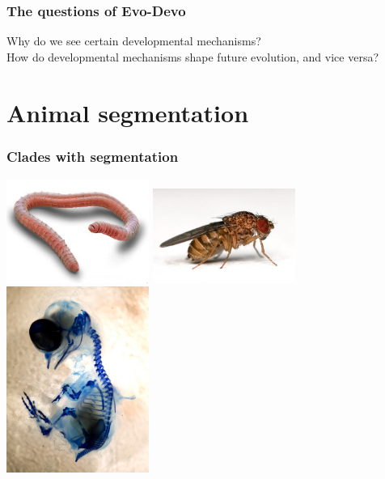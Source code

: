 \documentclass[compress]{beamer}
\begin{document}
\begin{frame}
\frametitle{The questions of Evo-Devo}   

Why do we see certain developmental mechanisms?\\
How do developmental mechanisms shape future evolution, and vice versa?

\end{frame}

\section{Animal segmentation}
\begin{frame}
    \frametitle{Clades with segmentation}
    \begin{center}
    \includegraphics[width=0.35\textwidth]{figures/annelid_SEM.jpg}
    \includegraphics[width=0.35\textwidth]{figures/drosophila.jpg}
    \includegraphics[width=0.35\textwidth]{figures/chick_vertebrae.jpg}
    \\~\\
    \end{center}
  \end{frame}
\end{document}
